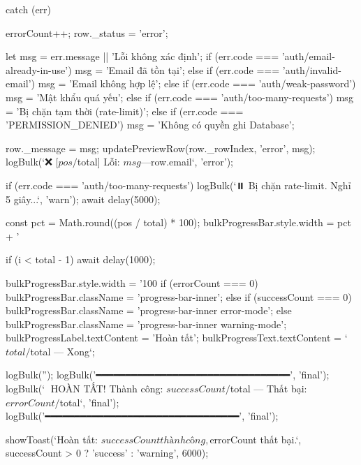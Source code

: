 {{{{                    } catch (err) {
                        errorCount++;
                        row._status = 'error';

                        let msg = err.message || 'Lỗi không xác định';
                        if (err.code === 'auth/email-already-in-use') msg = 'Email đã tồn tại';
                        else if (err.code === 'auth/invalid-email') msg = 'Email không hợp lệ';
                        else if (err.code === 'auth/weak-password') msg = 'Mật khẩu quá yếu';
                        else if (err.code === 'auth/too-many-requests') msg = 'Bị chặn tạm thời (rate-limit)';
                        else if (err.code === 'PERMISSION_DENIED') msg = 'Không có quyền ghi Database';

                        row._message = msg;
                        updatePreviewRow(row._rowIndex, 'error', msg);
                        logBulk(`❌ [${pos}/${total}] Lỗi: ${msg} — ${row.email}`, 'error');

                        if (err.code === 'auth/too-many-requests') {
                            logBulk(`⏸️  Bị chặn rate-limit. Nghỉ 5 giây...`, 'warn');
                            await delay(5000);
                        }
                    }

                    const pct = Math.round((pos / total) * 100);
                    bulkProgressBar.style.width = pct + '%

                    if (i < total - 1) {
                        await delay(1000);
                    }
                }

                bulkProgressBar.style.width = '100%
                if (errorCount === 0) {
                    bulkProgressBar.className = 'progress-bar-inner';
                } else if (successCount === 0) {
                    bulkProgressBar.className = 'progress-bar-inner error-mode';
                } else {
                    bulkProgressBar.className = 'progress-bar-inner warning-mode';
                }
                bulkProgressLabel.textContent = 'Hoàn tất';
                bulkProgressText.textContent = `${total}/${total} — Xong`;

                logBulk('');
                logBulk('━━━━━━━━━━━━━━━━━━━━━━━━━━━━━━━━━', 'final');
                logBulk(`🎉 HOÀN TẤT! Thành công: ${successCount}/${total} — Thất bại: ${errorCount}/${total}`, 'final');
                logBulk('━━━━━━━━━━━━━━━━━━━━━━━━━━━━━━━━━', 'final');

                showToast(`Hoàn tất: ${successCount} thành công, ${errorCount} thất bại.`, successCount > 0 ? 'success' : 'warning', 6000);

}}
